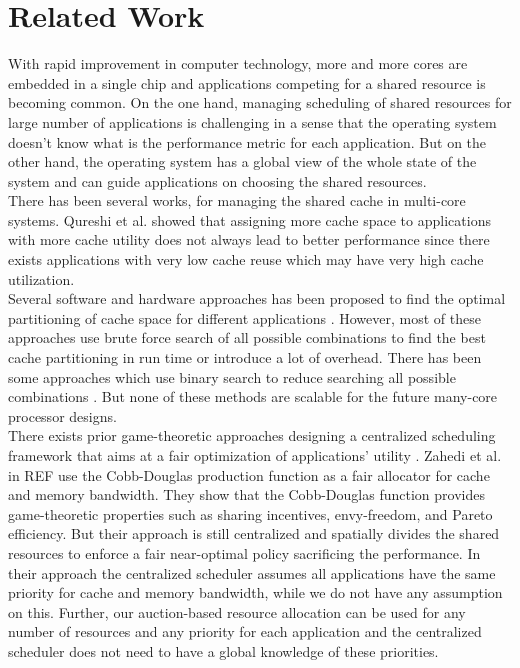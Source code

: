 \section{Related Work} \label{Related_works}
With rapid improvement in computer technology, more and more cores are embedded in a single chip and applications competing for a shared resource is becoming common. On the one hand, managing scheduling of shared resources for large number of applications is challenging in a sense that the operating system doesn't know what is the performance metric for each application. But on the other hand, the operating system has a global view of the whole state of the system and can guide applications on choosing the shared resources.\\ 
\indent There has been several works, for managing the shared cache in multi-core systems. Qureshi et al. \cite{qureshi2006utility} showed that assigning more cache space to applications with more cache utility does not always lead to better performance since there exists applications with very low cache reuse which may have very high cache utilization. \\
\indent Several software and hardware approaches has been proposed to find the optimal partitioning of cache space for different applications \cite{zhuravlev2010addressing}. However, most of these approaches use brute force search of all possible combinations to find the best cache partitioning in run time or introduce a lot of overhead. There has been some approaches which use binary search to reduce searching all possible combinations \cite{kim2004fair, lin2008gaining, tam2009rapidmrc}. But none of these methods are scalable for the future many-core processor designs.\\
\indent There exists prior game-theoretic approaches designing a centralized scheduling framework that aims at a fair optimization of applications' utility \cite{zahedi2014ref, llull2017cooper, ghodsi2011dominant, zahedi2015sharing, fan2016computational}. Zahedi et al. in REF \cite{zahedi2014ref, zahedi2015sharing} use the Cobb-Douglas production function as a fair allocator for cache and memory bandwidth. They show that the Cobb-Douglas function provides game-theoretic properties such as sharing incentives, envy-freedom, and Pareto efficiency. But their approach is still centralized and spatially divides the shared resources to enforce a fair near-optimal policy sacrificing the performance. In their approach the centralized scheduler assumes all applications have the same priority for cache and memory bandwidth, while we do not have any assumption on this. Further, our auction-based resource allocation can be used for any number of resources and any priority for each application and the centralized scheduler does not need to have a global knowledge of these priorities.  \\
